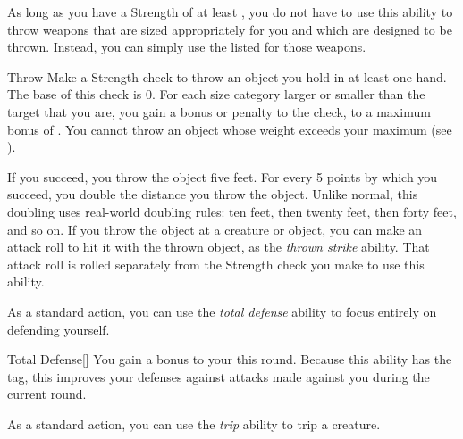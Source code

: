         As long as you have a Strength of at least , you do not have to use this ability to throw weapons that are sized appropriately for you and which are designed to be thrown.
        Instead, you can simply use the listed  for those weapons.

        \begin{activeability}{Throw}
            \rankline
            Make a Strength check to throw an object you hold in at least one hand.
            The base  of this check is 0.
            For each size category larger or smaller than the target that you are, you gain a  bonus or penalty to the check, to a maximum bonus of .
            You cannot throw an object whose weight exceeds your maximum  (see ).

            If you succeed, you throw the object five feet.
            For every 5 points by which you succeed, you double the distance you throw the object.
            Unlike normal, this doubling uses real-world doubling rules: ten feet, then twenty feet, then forty feet, and so on.
            If you throw the object at a creature or object, you can make an attack roll to hit it with the thrown object, as the \textit{thrown strike} ability.
            That attack roll is rolled separately from the Strength check you make to use this ability.
        \end{activeability}

        \label{Total Defense} As a standard action, you can use the \textit{total defense} ability to focus entirely on defending yourself.

        \begin{activeability}{Total Defense}[]
            \rankline
            You gain a  bonus to your  this round.
            Because this ability has the  tag, this improves your defenses against attacks made against you during the current round.
        \end{activeability}

        \label{Trip} As a standard action, you can use the \textit{trip} ability to trip a creature.

